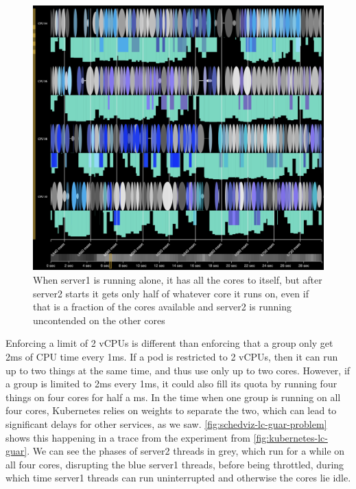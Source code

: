 \begin{figure}[t]
    \centering
    \includegraphics[width=\columnwidth]{graphs/schedviz-lc-guar-problem.png}
    \caption{When server1 is running alone, it has all the cores to itself, but
    after server2 starts it gets only half of whatever core it runs on, even if
    that is a fraction of the cores available and server2 is running uncontended
    on the other cores}\label{fig:schedviz-lc-guar-problem}
\end{figure}

Enforcing a limit of 2 vCPUs is different than enforcing that a group only get
2ms of CPU time every 1ms. If a pod is restricted to 2 vCPUs, then it can run up
to two things at the same time, and thus use only up to two cores. However, if a
group is limited to 2ms every 1ms, it could also fill its quota by running four
things on four cores for half a ms. In the time when one group is running on all
four cores, Kubernetes relies on weights to separate the two, which can lead to
significant delays for other services, as we saw.
\autoref{fig:schedviz-lc-guar-problem} shows this happening in a trace from the
experiment from \autoref{fig:kubernetes-lc-guar}. We can see the phases of
server2 threads in grey, which run for a while on all four cores, disrupting the
blue server1 threads, before being throttled, during which time server1 threads
can run uninterrupted and otherwise the cores lie idle.

